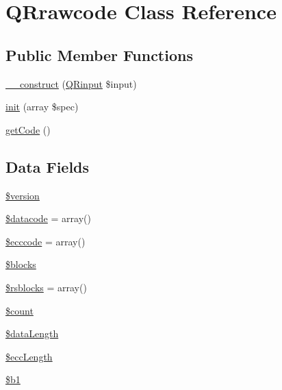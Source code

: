 \hypertarget{class_q_rrawcode}{\section{Q\-Rrawcode Class Reference}
\label{class_q_rrawcode}
}
\subsection*{Public Member Functions}
\begin{DoxyCompactItemize}
\item 
\hyperlink{class_q_rrawcode_a62a9953090c9872477d3f61d2aaac558}{\-\_\-\-\_\-construct} (\hyperlink{class_q_rinput}{Q\-Rinput} \$input)
\item 
\hyperlink{class_q_rrawcode_ab526b5d2495dc7c98976fac4b312ec3c}{init} (array \$spec)
\item 
\hyperlink{class_q_rrawcode_ab5e24da53b4a0d0848b18c1e832f47ff}{get\-Code} ()
\end{DoxyCompactItemize}
\subsection*{Data Fields}
\begin{DoxyCompactItemize}
\item 
\hyperlink{class_q_rrawcode_a17c8948c68aa44fa9961ae169b6a8961}{\$version}
\item 
\hyperlink{class_q_rrawcode_a859ef8b4b39f0d409b98e38f1ce832f8}{\$datacode} = array()
\item 
\hyperlink{class_q_rrawcode_a8f755e1f044d4b1b53ad52372e9d7d6b}{\$ecccode} = array()
\item 
\hyperlink{class_q_rrawcode_a320aeae1df42ee73ab4b3d9f7cf4ef3f}{\$blocks}
\item 
\hyperlink{class_q_rrawcode_a6216cc954f5667187c4e4f349202a58f}{\$rsblocks} = array()
\item 
\hyperlink{class_q_rrawcode_af789423037bbc89dc7c850e761177570}{\$count}
\item 
\hyperlink{class_q_rrawcode_a7bc9d25a373f0c0b88cfecda04f9cc58}{\$data\-Length}
\item 
\hyperlink{class_q_rrawcode_aec29857483c6cbfe18632d3d634bcc0c}{\$ecc\-Length}
\item 
\hyperlink{class_q_rrawcode_a0c197cd91498d17ebd701c346c397f0c}{\$b1}
\end{DoxyCompactItemize}


